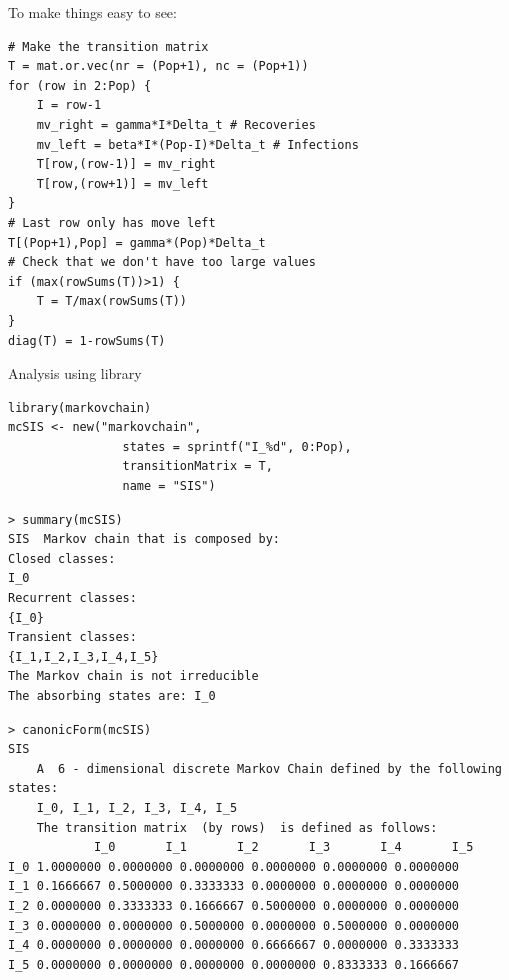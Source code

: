 \documentclass[aspectratio=43]{beamer}
\begin{document}


\begin{frame}[fragile]
    To make things easy to see: 
\begin{lstlisting}
# Make the transition matrix
T = mat.or.vec(nr = (Pop+1), nc = (Pop+1))
for (row in 2:Pop) {
    I = row-1
    mv_right = gamma*I*Delta_t # Recoveries
    mv_left = beta*I*(Pop-I)*Delta_t # Infections
    T[row,(row-1)] = mv_right
    T[row,(row+1)] = mv_left
}
# Last row only has move left
T[(Pop+1),Pop] = gamma*(Pop)*Delta_t
# Check that we don't have too large values
if (max(rowSums(T))>1) {
    T = T/max(rowSums(T))
}
diag(T) = 1-rowSums(T)    
\end{lstlisting}
\end{frame}


\begin{frame}[fragile]{Analysis using  library}
\begin{lstlisting}
library(markovchain)
mcSIS <- new("markovchain", 
                states = sprintf("I_%d", 0:Pop),
                transitionMatrix = T,
                name = "SIS")    
\end{lstlisting}
\vfill
\begin{lstlisting}
> summary(mcSIS)
SIS  Markov chain that is composed by: 
Closed classes: 
I_0 
Recurrent classes: 
{I_0}
Transient classes: 
{I_1,I_2,I_3,I_4,I_5}
The Markov chain is not irreducible 
The absorbing states are: I_0    
\end{lstlisting}
\end{frame}


\begin{frame}[fragile]
\begin{lstlisting}
> canonicForm(mcSIS)
SIS 
    A  6 - dimensional discrete Markov Chain defined by the following states: 
    I_0, I_1, I_2, I_3, I_4, I_5 
    The transition matrix  (by rows)  is defined as follows: 
            I_0       I_1       I_2       I_3       I_4       I_5
I_0 1.0000000 0.0000000 0.0000000 0.0000000 0.0000000 0.0000000
I_1 0.1666667 0.5000000 0.3333333 0.0000000 0.0000000 0.0000000
I_2 0.0000000 0.3333333 0.1666667 0.5000000 0.0000000 0.0000000
I_3 0.0000000 0.0000000 0.5000000 0.0000000 0.5000000 0.0000000
I_4 0.0000000 0.0000000 0.0000000 0.6666667 0.0000000 0.3333333
I_5 0.0000000 0.0000000 0.0000000 0.0000000 0.8333333 0.1666667    
\end{lstlisting}
\end{frame}
\end{document}
